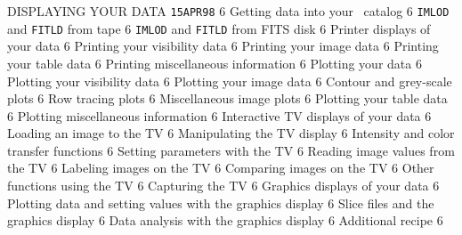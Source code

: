      {DISPLAYING YOUR DATA%
}                    {{\tt 15APR98}\hskip 0.6cm 6}
   {Getting data into your \AIPS\ catalog}       {6}
 {{\tt IMLOD} and {\tt FITLD} from tape}       {6}
 {{\tt IMLOD} and {\tt FITLD} from FITS disk}  {6}
   {Printer displays of your data}               {6}
 {Printing your visibility data}               {6}
 {Printing your image data}                    {6}
 {Printing your table data}                    {6}
 {Printing miscellaneous information}          {6}
   {Plotting your data}                          {6}
 {Plotting your visibility data}               {6}
 {Plotting your image data}                    {6}
 {Contour and grey-scale plots}             {6}
 {Row tracing plots}                        {6}
 {Miscellaneous image plots}                {6}
 {Plotting your table data}                    {6}
 {Plotting miscellaneous information}          {6}
   {Interactive TV displays of your data}        {6}
 {Loading an image to the TV}                  {6}
 {Manipulating the TV display}                 {6}
 {Intensity and color transfer functions}      {6}
 {Setting parameters with the TV}              {6}
 {Reading image values from the TV}            {6}
 {Labeling images on the TV}                   {6}
 {Comparing images on the TV}                  {6}
 {Other functions using the TV}                {6}
 {Capturing the TV}                            {6}
   {Graphics displays of your data}              {6}
 {Plotting data and setting values with
                     the graphics display}                    {6}
 {Slice files and the graphics display}        {6}
 {Data analysis with the graphics display}     {6}
   {Additional recipe}                           {6}

